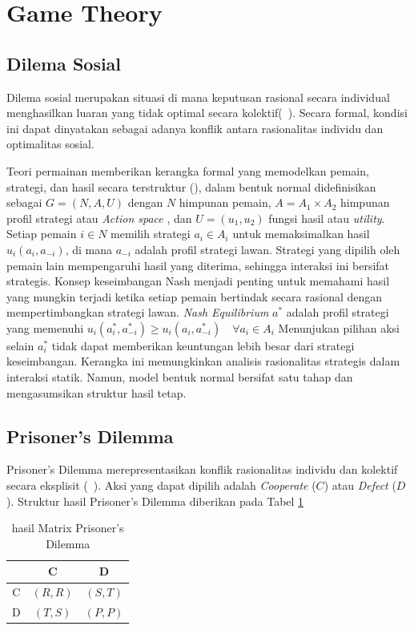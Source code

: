 \section{Game Theory}
\subsection{Dilema Sosial}

Dilema sosial merupakan situasi di mana keputusan rasional secara individual menghasilkan luaran yang tidak optimal secara kolektif(~\cite{axelrod_evolution_1981}). Secara formal, kondisi ini dapat dinyatakan sebagai adanya konflik antara rasionalitas individu dan optimalitas sosial.

Teori permainan memberikan kerangka formal yang memodelkan pemain, strategi, dan hasil secara terstruktur (\cite{bonanno_game_2024}), dalam bentuk normal didefinisikan sebagai $G = (N, A, U)$ dengan $N$ himpunan pemain, $A = A_1 \times A_2$ himpunan profil strategi atau \textit{Action space }, dan $U = (u_1, u_2)$ fungsi hasil atau \textit{utility}. Setiap pemain $i \in N$ memilih strategi $a_i \in A_i$ untuk memaksimalkan hasil $u_i(a_i, a_{-i})$, di mana $a_{-i}$ adalah profil strategi lawan. Strategi yang dipilih oleh pemain lain mempengaruhi hasil yang diterima, sehingga interaksi ini bersifat strategis. Konsep keseimbangan Nash menjadi penting untuk memahami hasil yang mungkin terjadi ketika setiap pemain bertindak secara rasional dengan mempertimbangkan strategi lawan. \textit{Nash Equilibrium} $a^*$ adalah profil strategi yang memenuhi $u_i(a_i^*, a_{-i}^*) \ge u_i(a_i, a_{-i}^*) \quad \forall a_i \in A_i$ Menunjukan pilihan aksi selain $a_i^*$ tidak dapat memberikan keuntungan lebih besar dari strategi keseimbangan. Kerangka ini memungkinkan analisis rasionalitas strategis dalam interaksi statik. Namun, model bentuk normal bersifat satu tahap dan mengasumsikan struktur hasil tetap.

\subsection{Prisoner's Dilemma}\label{sec:PrisonersDilemma}

Prisoner's Dilemma merepresentasikan konflik rasionalitas individu dan kolektif secara eksplisit (~\cite{axelrod_evolution_1981}). Aksi yang dapat dipilih adalah \textit{Cooperate} ($C$) atau \textit{Defect} ($D$). Struktur hasil Prisoner's Dilemma diberikan 
pada Tabel \ref{tab:Payoff}

\begin{table}[h]
\centering
\caption{hasil Matrix Prisoner's Dilemma}\label{tab:Payoff}
\begin{tabular}{c|cc}
& C & D \\
\hline
C & $(R,R)$ & $(S,T)$ \\
D & $(T,S)$ & $(P,P)$
\end{tabular}
\end{table}

